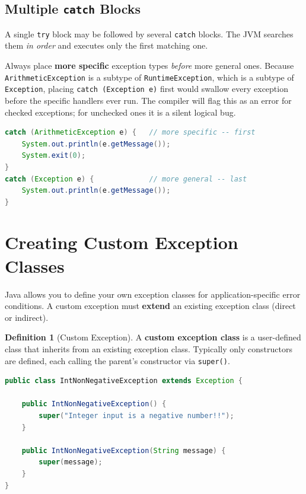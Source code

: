 \documentclass[11pt, a4paper, notitlepage]{report}
\theoremstyle{definition}
\newtheorem{definition}[theorem]{Definition}
\theoremstyle{remark}
\theoremstyle{definition}
\begin{document}
\subsection{Multiple \texttt{catch} Blocks}
\label{sec:ch4-multiple-catch}

A single \texttt{try} block may be followed by several \texttt{catch} blocks. The JVM searches them \emph{in order} and executes only the first matching one.

\begin{examtip}[title={Exam Tip: Order Your \texttt{catch} Blocks Correctly}]
Always place \textbf{more specific} exception types \emph{before} more general ones. Because \texttt{ArithmeticException} is a subtype of \texttt{RuntimeException}, which is a subtype of \texttt{Exception}, placing \texttt{catch (Exception e)} first would swallow every exception before the specific handlers ever run. The compiler will flag this as an error for checked exceptions; for unchecked ones it is a silent logical bug.
\end{examtip}

\begin{lstlisting}[language=Java]
catch (ArithmeticException e) {   // more specific -- first
    System.out.println(e.getMessage());
    System.exit(0);
}
catch (Exception e) {             // more general -- last
    System.out.println(e.getMessage());
}
\end{lstlisting}

\section{Creating Custom Exception Classes}
\label{sec:ch4-custom-exceptions}

Java allows you to define your own exception classes for application-specific error conditions. A custom exception must \textbf{extend} an existing exception class (direct or indirect).

\begin{definition}[Custom Exception]
\label{def:ch4-custom}
A \textbf{custom exception class} is a user-defined class that inherits from an existing exception class. Typically only constructors are defined, each calling the parent's constructor via \texttt{super()}.
\end{definition}

\begin{lstlisting}[language=Java]
public class IntNonNegativeException extends Exception {

    public IntNonNegativeException() {
        super("Integer input is a negative number!!");
    }

    public IntNonNegativeException(String message) {
        super(message);
    }
}
\end{lstlisting}
\end{document}
